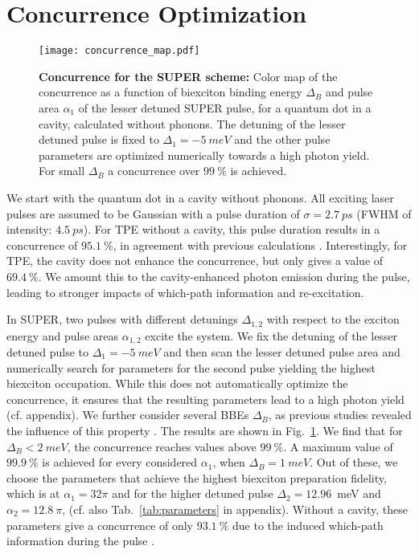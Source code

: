 \documentclass[%
 reprint,superscriptaddress,
 amsmath,amssymb,
 aps]{revtex4-2}
\begin{document}
\section{Concurrence Optimization}

\begin{figure}
    \centering
    \texttt{[image: concurrence\_map.pdf]}
    \caption{\textbf{Concurrence for the SUPER scheme:}
    Color map of the concurrence as a function of biexciton binding energy $\Delta_B$ and pulse area $\alpha_1$ of the lesser detuned SUPER pulse, for a quantum dot in a cavity, calculated without phonons. The detuning of the lesser detuned pulse is fixed to $\Delta_1=\SI{-5}{meV}$ and the other pulse parameters are optimized numerically towards a high photon yield. For small $\Delta_B$ a concurrence over $\SI{99}{\percent}$ is achieved.
    }
    \label{fig:area1_delta_b}
\end{figure}
We start with the quantum dot in a cavity without phonons. All exciting laser pulses are assumed to be Gaussian with a pulse duration of $\sigma=\SI{2.7}{ps}$ (FWHM of intensity: $\SI{4.5}{ps}$). For TPE without a cavity, this pulse duration results in a concurrence of $\SI{95.1}{\percent}$, in agreement with previous calculations \cite{seidelmann2022two}. Interestingly, for TPE, the cavity does not enhance the concurrence, but only gives a value of $\SI{69.4}{\percent}$. We amount this to the cavity-enhanced photon emission during the pulse, leading to stronger impacts of which-path information and re-excitation.

In SUPER, two pulses with different detunings $\Delta_{1,2}$ with respect to the exciton energy and pulse areas $\alpha_{1,2}$ excite the system. We fix the detuning of the lesser detuned pulse to $\Delta_1=\SI{-5}{meV}$ and then scan the lesser detuned pulse area and numerically search for parameters for the second pulse yielding the highest biexciton occupation. While this does not automatically optimize the concurrence, it ensures that the resulting parameters lead to a high photon yield (cf. appendix). We further consider several BBEs $\Delta_B$, as previous studies revealed the influence of this property \cite{schumacher2012cavity,seidelmann2019phonon}. The results are shown in Fig.~\ref{fig:area1_delta_b}. We find that for $\Delta_B  < \SI{2}{meV}$, the concurrence reaches values above $\SI{99}{\percent}$. A maximum value of $\SI{99.9}{\percent}$ is achieved for every considered $\alpha_1$, when $\Delta_B=\SI{1}{meV}$. Out of these, we choose the parameters that achieve the highest biexciton preparation fidelity, which is at $\alpha_1=32\pi$ and for the higher detuned pulse $\Delta_2=12.96$~meV and $\alpha_2=12.8~\pi$, (cf. also Tab.~\ref{tab:parameters} in appendix). Without a cavity, these parameters give a concurrence of only $\SI{93.1}{\percent}$ due to the induced which-path information during the pulse \cite{seidelmann2022two}.
\end{document}
